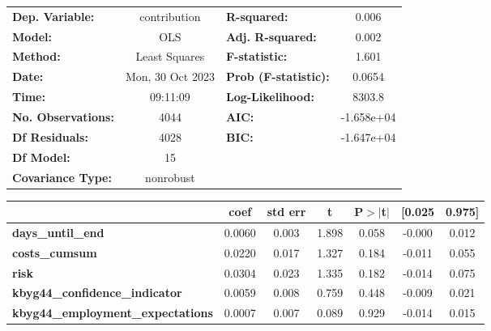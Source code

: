 \begin{center}
\begin{tabular}{lclc}
\toprule
\textbf{Dep. Variable:}                   &   contribution   & \textbf{  R-squared:         } &     0.006   \\
\textbf{Model:}                           &       OLS        & \textbf{  Adj. R-squared:    } &     0.002   \\
\textbf{Method:}                          &  Least Squares   & \textbf{  F-statistic:       } &     1.601   \\
\textbf{Date:}                            & Mon, 30 Oct 2023 & \textbf{  Prob (F-statistic):} &   0.0654    \\
\textbf{Time:}                            &     09:11:09     & \textbf{  Log-Likelihood:    } &    8303.8   \\
\textbf{No. Observations:}                &        4044      & \textbf{  AIC:               } & -1.658e+04  \\
\textbf{Df Residuals:}                    &        4028      & \textbf{  BIC:               } & -1.647e+04  \\
\textbf{Df Model:}                        &          15      & \textbf{                     } &             \\
\textbf{Covariance Type:}                 &    nonrobust     & \textbf{                     } &             \\
\bottomrule
\end{tabular}
\begin{tabular}{lcccccc}
                                          & \textbf{coef} & \textbf{std err} & \textbf{t} & \textbf{P$> |$t$|$} & \textbf{[0.025} & \textbf{0.975]}  \\
\midrule
\textbf{days\_until\_end}                 &       0.0060  &        0.003     &     1.898  &         0.058        &       -0.000    &        0.012     \\
\textbf{costs\_cumsum}                    &       0.0220  &        0.017     &     1.327  &         0.184        &       -0.011    &        0.055     \\
\textbf{risk}                             &       0.0304  &        0.023     &     1.335  &         0.182        &       -0.014    &        0.075     \\
\textbf{kbyg44\_confidence\_indicator}    &       0.0059  &        0.008     &     0.759  &         0.448        &       -0.009    &        0.021     \\
\textbf{kbyg44\_employment\_expectations} &       0.0007  &        0.007     &     0.089  &         0.929        &       -0.014    &        0.015     \\

\end{tabular}
\end{center}
